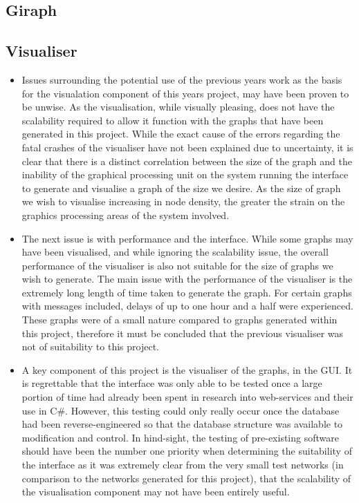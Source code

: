 \subsection{Giraph}

\subsection{Visualiser}

\begin{itemize}

\item Issues surrounding the potential use of the previous years work as the basis for the visualation component of this years project, may have been proven to be unwise. As the visualisation, while visually pleasing, does not have the scalability required to allow it function with the graphs that have been generated in this project. While the exact cause of the errors regarding the fatal crashes of the visualiser have not been explained due to uncertainty, it is clear that there is a distinct correlation between the size of the graph and the inability of the graphical processing unit on the system running the interface to generate and visualise a graph of the size we desire. As the size of graph we wish to visualise increasing in node density, the greater the strain on the graphics processing areas of the system involved. 

\item The next issue is with performance and the interface. While some graphs may have been visualised, and while ignoring the scalability issue, the overall performance of the visualiser is also not suitable for the size of graphs we wish to generate. The main issue with the performance of the visualiser is the extremely long length of time taken to generate the graph. For certain graphs with messages included, delays of up to one hour and a half were experienced. These graphs were of a small nature compared to graphs generated within this project, therefore it must be concluded that the previous visualiser was not of suitability to this project.

\item A key component of this project is the visualiser of the graphs, in the GUI. It is regrettable that the interface was only able to be tested once a large portion of time had already been spent in research into web-services and their use in C\#. However, this testing could only really occur once the database had been reverse-engineered so that the database structure was available to modification and control. In hind-sight, the testing of pre-existing software should have been the number one priority when determining the suitability of the interface as it was extremely clear from the very small test networks (in comparison to the networks generated for this project), that the scalability of the visualisation component may not have been entirely useful.
\end{itemize}

